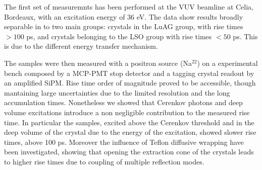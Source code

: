 The first set of measuremnts has been performed at the VUV beamline at Celia, Bordeaux, with an excitation energy of 36 eV. 
The data show results broadly separable in to two main groups: crystals in the LuAG group, with rise times $>100$ ps, and crystals belonging to the LSO group with rise times $<50$ ps. This is due to the different energy transfer mechanism.

The samples were then measured with a positron source (Na$^{22}$) on a experimental bench composed by a MCP-PMT stop detector and a tagging crystal readout by an amplified SiPM.
Rise time order of magnitude proved to be accessible, though mantaining large uncertainties due to the limited resolution and the long accumulation times.
Nonetheless we showed that Cerenkov photons and deep volume excitations introduce a non negligible contribution to the measured rise time. In particular the samples, excited above the Cerenkov threshold and in the deep volume of the crystal due to the energy of the excitation, showed slower rise times, above 100 ps.
Moreover the influence of Teflon diffusive wrapping have been investigated, showing that opening the extraction cone of the crystals leads to higher rise times due to coupling of multiple reflection modes.

